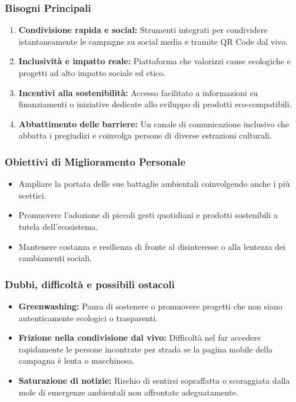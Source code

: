 \documentclass[11pt,a4paper]{article}
\begin{document}
\subsubsection{Bisogni Principali}
\begin{enumerate}
    \item \textbf{Condivisione rapida e social:} Strumenti integrati per condividere istantaneamente le campagne su social media e tramite QR Code dal vivo.
    \item \textbf{Inclusività e impatto reale:} Piattaforma che valorizzi cause ecologiche e progetti ad alto impatto sociale ed etico.
    \item \textbf{Incentivi alla sostenibilità:} Accesso facilitato a informazioni su finanziamenti o iniziative dedicate allo sviluppo di prodotti eco-compatibili.
    \item \textbf{Abbattimento delle barriere:} Un canale di comunicazione inclusivo che abbatta i pregiudizi e coinvolga persone di diverse estrazioni culturali.
\end{enumerate}

\subsubsection{Obiettivi di Miglioramento Personale}
\begin{itemize}
    \item Ampliare la portata delle sue battaglie ambientali coinvolgendo anche i più scettici.
    \item Promuovere l'adozione di piccoli gesti quotidiani e prodotti sostenibili a tutela dell'ecosistema.
    \item Mantenere costanza e resilienza di fronte al disinteresse o alla lentezza dei cambiamenti sociali.
\end{itemize}

\subsubsection{Dubbi, difficoltà e possibili ostacoli}
\begin{itemize}
    \item \textbf{Greenwashing:} Paura di sostenere o promuovere progetti che non siano autenticamente ecologici o trasparenti.
    \item \textbf{Frizione nella condivisione dal vivo:} Difficoltà nel far accedere rapidamente le persone incontrate per strada se la pagina mobile della campagna è lenta o macchinosa.
    \item \textbf{Saturazione di notizie:} Rischio di sentirsi sopraffatta o scoraggiata dalla mole di emergenze ambientali non affrontate adeguatamente.
\end{itemize}
\end{document}
